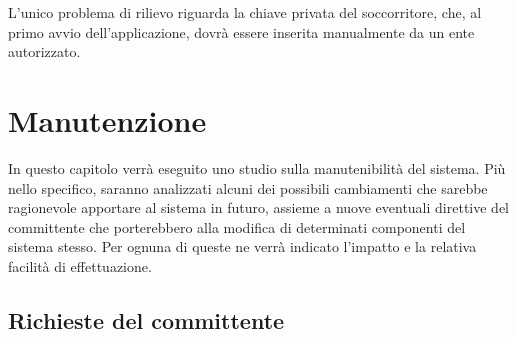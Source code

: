 \documentclass[a4paper,12pt]{report}
\begin{document}
L'unico problema di rilievo riguarda la chiave privata del soccorritore, che, al primo avvio dell'applicazione, dovrà essere inserita manualmente da un ente autorizzato. 


\chapter{Manutenzione} \label{maintenance}
In questo capitolo verrà eseguito uno studio sulla manutenibilità del sistema. Più nello specifico, saranno analizzati alcuni dei possibili cambiamenti che sarebbe ragionevole apportare al sistema in futuro, assieme a nuove eventuali direttive del committente che porterebbero alla modifica di determinati componenti del sistema stesso. Per ognuna di queste ne verrà indicato l'impatto e la relativa facilità di effettuazione.

\section{Richieste del committente}
\end{document}
